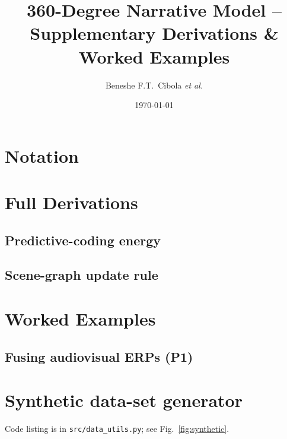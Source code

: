 \documentclass[11pt]{article}
\title{360-Degree Narrative Model –\\
Supplementary Derivations \& Worked Examples}
\author{Beneshe F.T.\ Cibola \textit{et al.}}
\date{\today}
\begin{document}
\maketitle
\tableofcontents
\clearpage

\section{Notation}


\section{Full Derivations}
\subsection{Predictive-coding energy}

\subsection{Scene-graph update rule}


\section{Worked Examples}
\subsection{Fusing audiovisual ERPs (P1)}


\appendix
\section{Synthetic data-set generator}
Code listing is in \texttt{src/data\_utils.py}; see Fig.~\ref{fig:synthetic}.


\end{document}
